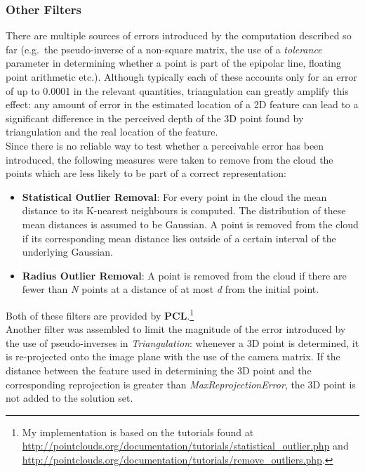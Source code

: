 \documentclass[12pt,a4paper,twoside,openright]{report}
\begin{document}
\subsubsection{Other Filters}
There are multiple sources of errors introduced by the computation described so far (e.g.\ the pseudo-inverse of a non-square matrix, the use of a \emph{tolerance} parameter in determining whether a point is part of the epipolar line, floating point arithmetic etc.). Although typically each of these accounts only for an error of up to 0.0001 in the relevant quantities, triangulation can greatly amplify this effect: any amount of error in the estimated location of a 2D feature can lead to a significant difference in the perceived depth of the 3D point found by triangulation and the real location of the feature.\\
Since there is no reliable way to test whether a perceivable error has been introduced, the following measures were taken to remove from the cloud the points which are less likely to be part of a correct representation:
\begin{itemize}
\item \textbf{Statistical Outlier Removal}: For every point in the cloud the mean distance to its K-nearest neighbours is computed. The distribution of these mean distances is assumed to be Gaussian. A point is removed from the cloud if its corresponding mean distance lies outside of a certain interval of the underlying Gaussian.  
\item \textbf{Radius Outlier Removal}: A point is removed from the cloud if there are fewer than \emph{N} points at a distance of at most \emph{d} from the initial point. 
\end{itemize}
Both of these filters are provided by \textbf{PCL}.\footnote{My implementation is based on the tutorials found at \url{http://pointclouds.org/documentation/tutorials/statistical_outlier.php} and \url{http://pointclouds.org/documentation/tutorials/remove_outliers.php}.}\\
\linebreak
Another filter was assembled to limit the magnitude of the error introduced by the use of pseudo-inverses in \emph{Triangulation}: whenever a 3D point is determined, it is re-projected onto the image plane with the use of the camera matrix. If the distance between the feature used in determining the 3D point and the corresponding reprojection is greater than \emph{MaxReprojectionError}, the 3D point is not added to the solution set. 
\end{document}
